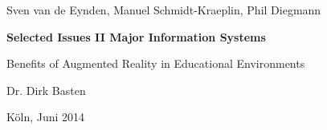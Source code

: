 \vspace*{1mm}

\thispagestyle{empty}
Sven van de Eynden, Manuel Schmidt-Kraeplin, Phil Diegmann

\vspace*{32mm}

% 
\begin{center}
\textbf{
    Selected Issues II
\linebreak
    Major Information Systems
}
\end{center}

\vspace*{32mm}

\begin{center}
\LARGE 
Benefits of Augmented Reality in Educational Environments
\end{center}

\vspace*{32mm}

\begin{center}
Dr. Dirk Basten
\end{center}

\vspace*{32mm}

\begin{center}
Köln, Juni 2014
\end{center}